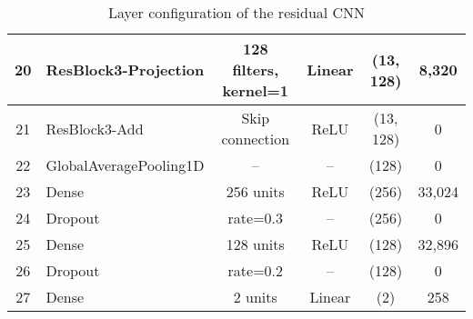 \begin{table}[htbp]
{\begin{tabular}{|c|l|c|c|c|c|}
20 & ResBlock3-Projection & 128 filters, kernel=1 & Linear & (13, 128) & 8,320 \\ \hline
21 & ResBlock3-Add & Skip connection & ReLU & (13, 128) & 0 \\ \hline
22 & GlobalAveragePooling1D & -- & -- & (128) & 0 \\ \hline
23 & Dense & 256 units & ReLU & (256) & 33,024 \\ \hline
24 & Dropout & rate=0.3 & -- & (256) & 0 \\ \hline
25 & Dense & 128 units & ReLU & (128) & 32,896 \\ \hline
26 & Dropout & rate=0.2 & -- & (128) & 0 \\ \hline
27 & Dense & 2 units & Linear & (2) & 258 \\ \hline
\end{tabular}%
}
\caption{Layer configuration of the residual CNN}
\label{tab:residual_cnn}
\end{table}

